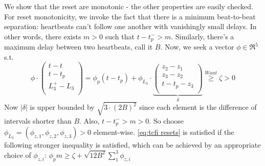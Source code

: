 \begin{prf}
We show that the reset are monotonic - the other properties are easily checked.
For reset monotonicity, we invoke the fact that there is a minimum beat-to-beat separation: heartbeats can't follow one another with vanishingly small delays. 
In other words, there exists $m>0$ such that $t - t_p^- > m$.
Similarly, there's a maximum delay between two heartbeats, call it $B$.
Now, we seek a vector $\phi \in \Re^5$ s.t. 
\begin{equation}
\label{eq:tcfi resets}
\phi \cdot \left(\begin{matrix}
t-t\\t - t_p\\L_3^+ - L_3\\
\end{matrix}
\right) = \phi_p(t-t_p) +\phi_{L_3} \cdot \underbrace{\left(\begin{matrix}
z_2-z_1\\z_3-z_2\\t-t_p - z_3\\
\end{matrix}
\right)}_{\delta} \stackrel{Want}{\geq} \zeta > 0
\end{equation} 
Now $|\delta|$ is upper bounded by $\sqrt{3\cdot (2B)^2}$ since each element is the difference of intervals shorter than $B$.
Also, $t-t_p^- > m > 0$.
So choose $\phi_{L_3} = (\phi_{z,1},\phi_{z,2},\phi_{z,3})>0$ element-wise.
\eqref{eq:tcfi resets} is satisfied if the following stronger inequality is satisfied, which can be achieved by an appropriate choice of $\phi_{z,i}$: \;
$\phi_p m \geq \zeta + \sqrt{12B^2}\sum_1^3\phi_{z,i}$
\end{prf}






